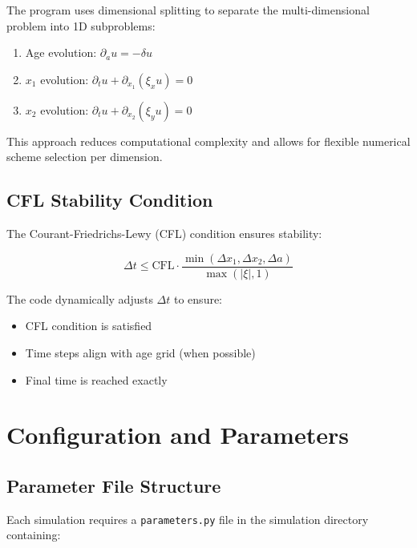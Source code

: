 \documentclass[12pt,a4paper]{report}
\begin{document}
The program uses dimensional splitting to separate the multi-dimensional problem into 1D subproblems:

\begin{enumerate}
    \item Age evolution: $\partial_a u = -\delta u$
    \item $x_1$ evolution: $\partial_t u + \partial_{x_1}(\xi_x u) = 0$
    \item $x_2$ evolution: $\partial_t u + \partial_{x_2}(\xi_y u) = 0$
\end{enumerate}

This approach reduces computational complexity and allows for flexible numerical scheme selection per dimension.

\section{CFL Stability Condition}

The Courant-Friedrichs-Lewy (CFL) condition ensures stability:

\[\Delta t \leq \text{CFL} \cdot \frac{\min(\Delta x_1, \Delta x_2, \Delta a)}{\max(|\xi|, 1)}\]

The code dynamically adjusts $\Delta t$ to ensure:
\begin{itemize}
    \item CFL condition is satisfied
    \item Time steps align with age grid (when possible)
    \item Final time is reached exactly
\end{itemize}

\chapter{Configuration and Parameters}

\section{Parameter File Structure}

Each simulation requires a \texttt{parameters.py} file in the simulation directory containing:
\end{document}
